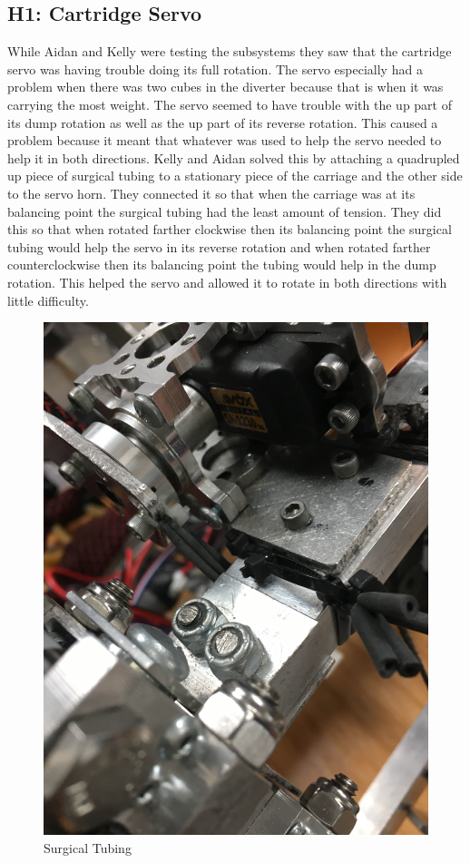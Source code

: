 \documentclass{article}
\begin{document}
\subsection{H1: Cartridge Servo}

While Aidan and Kelly were testing the subsystems they saw that the cartridge servo was having trouble doing its full rotation. The servo especially had a problem when there was two cubes in the diverter because that is when it was carrying the most weight. The servo seemed to have trouble with the up part of its dump rotation as well as the up part of its reverse rotation. This caused a problem because it meant that whatever was used to help the servo needed to help it in both directions. Kelly and Aidan solved this by attaching a quadrupled up piece of surgical tubing to a stationary piece of the carriage and the other side to the servo horn. They connected it so that when the carriage was at its balancing point the surgical tubing had the least amount of tension. They did this so that when rotated farther clockwise then its balancing point the surgical tubing would help the servo in its reverse rotation and when rotated farther counterclockwise then its balancing point the tubing would help in the dump rotation. This helped the servo and allowed it to rotate in both directions with little difficulty.

\begin{figure}
    \centering
    \includegraphics[width=.6 \textwidth]{21_01-21/images/tubing.JPG}
    \caption{Surgical Tubing}
    \label{fig:tubing}
\end{figure}
\end{document}
